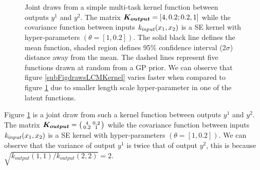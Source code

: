 \begin{figure}[!ht]
  \centering
    \quad
{}\quad

       \caption{Joint draws from a simple multi-task kernel function between outputs $y^{1}$ and $y^{2}$. The matrix  $\boldsymbol{K_{output}} = [4 , 0.2; 0.2 , 1]$ while the covariance function between inputs $\mathit{k_{input}}(x_{1}, x_{2})$ is a SE kernel with hyper-parameters $(\theta = [1, 0.2])$. The solid black line defines the mean function, shaded region defines 95\% confidence interval (2$\sigma$) distance away from the mean. The dashed lines represent five functions drawn at random from a GP prior. We can observe that figure \ref{subFigdrawsLCMKernel} varies faster when compared to figure \ref{subFigdrawsBonillaKernel} due to smaller length scale hyper-parameter in one of the latent functions.}
       \label{subFigdrawsBonillaKernel}
\end{figure}

Figure \ref{subFigdrawsBonillaKernel} is a joint draw from such a kernel function between outputs $y^{1}$ and $y^{2}$. The matrix $\boldsymbol{K_{output}} = \bigl( \begin{smallmatrix} 4 & 0.2\\ 0.2 & 1\end{smallmatrix}\bigr)$ while the covariance function between inputs $\mathit{k_{input}}(x_{1}, x_{2})$ is a SE kernel with hyper-parameters $(\theta = [1, 0.2])$. We can observe that the variance of output $y^{1}$ is twice that of output $y^{2}$, this is because $\sqrt{k_{output}(1, 1)/k_{output}(2, 2)} = 2$.


